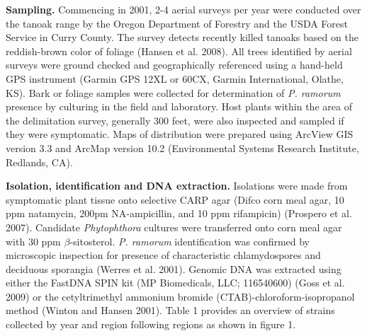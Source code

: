 \documentclass[double,12pt]{beavtex}
\begin{document}
  \textbf{Sampling.} Commencing in 2001, 2-4 aerial surveys per year were
  conducted over the tanoak range by the Oregon Department of Forestry and
  the USDA Forest Service in Curry County. The survey detects recently
  killed tanoaks based on the reddish-brown color of foliage (Hansen et
  al. 2008). All trees identified by aerial surveys were ground checked
  and geographically referenced using a hand-held GPS instrument (Garmin
  GPS 12XL or 60CX, Garmin International, Olathe, KS). Bark or foliage
  samples were collected for determination of \emph{P. ramorum} presence
  by culturing in the field and laboratory. Host plants within the area of
  the delimitation survey, generally 300 feet, were also inspected and
  sampled if they were symptomatic. Maps of distribution were prepared
  using ArcView GIS version 3.3 and ArcMap version 10.2 (Environmental
  Systems Research Institute, Redlands, CA).
  
  \textbf{Isolation, identification and DNA extraction.} Isolations were
  made from symptomatic plant tissue onto selective CARP agar (Difco corn
  meal agar, 10 ppm natamycin, 200pm NA-ampicillin, and 10 ppm rifampicin)
  (Prospero et al. 2007). Candidate \emph{Phytophthora} cultures were
  transferred onto corn meal agar with 30 ppm \(\beta\)-sitosterol.
  \emph{P. ramorum} identification was confirmed by microscopic inspection
  for presence of characteristic chlamydospores and deciduous sporangia
  (Werres et al. 2001). Genomic DNA was extracted using either the FastDNA
  SPIN kit (MP Biomedicals, LLC; 116540600) (Goss et al. 2009) or the
  cetyltrimethyl ammonium bromide (CTAB)-chloroform-isopropanol method
  (Winton and Hansen 2001). Table 1 provides an overview of strains
  collected by year and region following regions as shown in figure 1.
  
\end{document}
